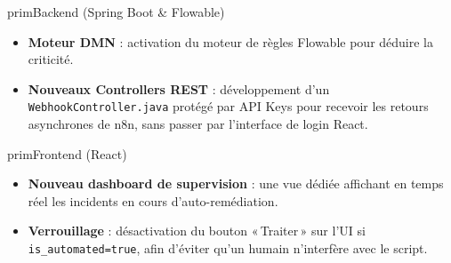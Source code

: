 \documentclass[10.5pt,a4paper]{article}
\newcommand{\code}[1]{\texttt{\textcolor{codec}{#1}}}
\begin{document}
\begin{card}{prim}{Backend (Spring Boot \& Flowable)}
\begin{itemize}
  \item \textbf{Moteur DMN} : activation du moteur de règles Flowable pour déduire la criticité.
  \item \textbf{Nouveaux Controllers REST} : développement d'un \code{WebhookController.java} protégé par API Keys pour recevoir les retours asynchrones de n8n, sans passer par l'interface de login React.
\end{itemize}
\end{card}

\begin{card}{prim}{Frontend (React)}
\begin{itemize}
  \item \textbf{Nouveau dashboard de supervision} : une vue dédiée affichant en temps réel les incidents en cours d'auto-remédiation.
  \item \textbf{Verrouillage} : désactivation du bouton «\,Traiter\,» sur l'UI si \code{is\_automated=true}, afin d'éviter qu'un humain n'interfère avec le script.
\end{itemize}
\end{card}
\end{document}
